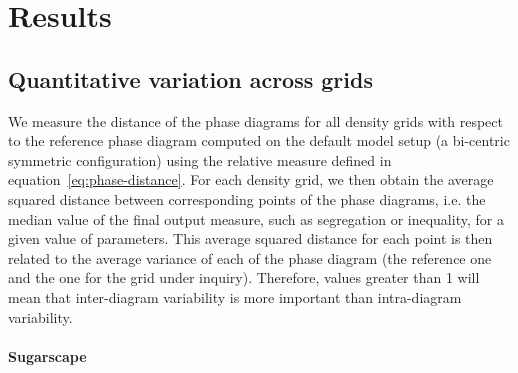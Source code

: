 \documentclass[3p,times,procedia]{elsarticle}
\begin{document}
\section{Results}


\subsection{Quantitative variation across grids}

We measure the distance of the phase diagrams for all density grids with respect to the reference phase diagram computed on the default model setup (a bi-centric symmetric configuration) using the relative measure defined in equation~\ref{eq:phase-distance}. For each density grid, we then obtain the average squared distance between corresponding points of the phase diagrams, i.e. the median value of the final output measure, such as segregation or inequality, for a given value of parameters. This average squared distance for each point is then related to the average variance of each of the phase diagram (the reference one and the one for the grid under inquiry). Therefore, values greater than 1 will mean that inter-diagram variability is more important than intra-diagram variability.

\paragraph{Sugarscape} 


\end{document}
